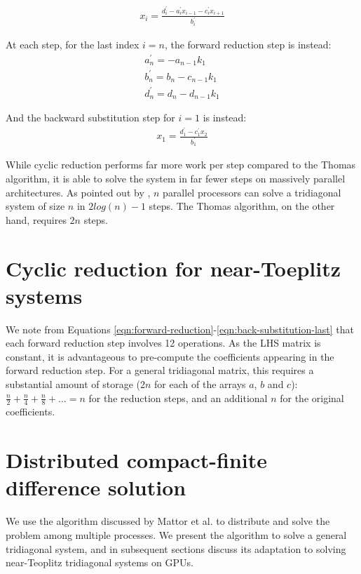 \documentclass{elsarticle}
\begin{document}
\begin{align} \label{eqn:back-substitution}
x_i = \frac{d^{\prime}_i - a^{\prime}_ix_{i-1} - c^{\prime}_ix_{i+1}}{b^{\prime}_i}
\end{align}

At each step, for the last index $i=n$,
the forward reduction step is instead:
\begin{align} \label{eqn:forward-reduction-last}
    & a^{\prime}_n = -a_{n-1}k_1 & \\
    & b^{\prime}_n = b_n - c_{n-1}k_1 & \\
    & d^{\prime}_n = d_n - d_{n-1}k_1 &
\end{align}

And the backward substitution step for $i=1$ is instead:
\begin{align} \label{eqn:back-substitution-first}
x_1 = \frac{d^{\prime}_1 - c^{\prime}_1x_{2}}{b^{\prime}_1}
\end{align}

While cyclic reduction performs far more work per step
compared to the Thomas algorithm,
it is able to solve the system in far fewer steps
on massively parallel architectures.
As pointed out by \cite{Zhang2010FTS},
$n$ parallel processors can solve a tridiagonal system
of size $n$ in $2log(n) - 1$ steps.
The Thomas algorithm, on the other hand,
requires $2n$ steps.

\section{Cyclic reduction for near-Toeplitz systems}

We note from
Equations \ref{eqn:forward-reduction}-\ref{eqn:back-substitution-last}
that each forward reduction step involves 12 operations.
As the LHS matrix is constant,
it is advantageous to pre-compute the coefficients appearing
in the forward reduction step.
For a general tridiagonal matrix,
this requires a substantial amount of storage
(2$n$ for each of the arrays $a$, $b$ and $c$):
$\frac{n}{2} + \frac{n}{4} + \frac{n}{8} + ... = n$
for the reduction steps,
and an additional $n$ for the original coefficients.
\section{Distributed compact-finite difference solution} 

We use the algorithm discussed by Mattor et al.
\cite{mattor1995algorithm}
to distribute and solve the problem among multiple processes. 
We present the algorithm to solve a general tridiagonal system,
and in subsequent sections discuss its adaptation to solving
near-Teoplitz tridiagonal systems on GPUs.
\end{document}
